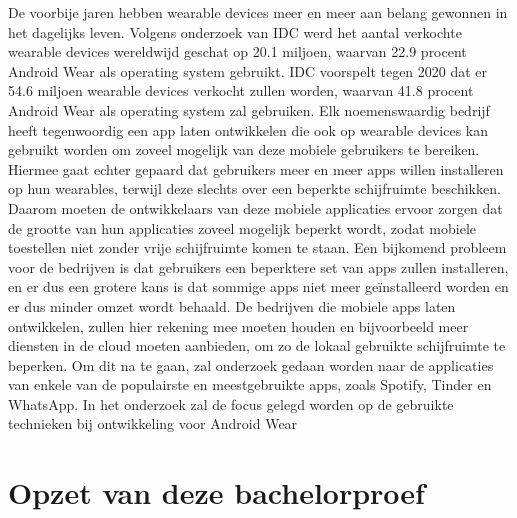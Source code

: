 De voorbije jaren hebben wearable devices meer en meer aan belang gewonnen in het dagelijks leven. Volgens onderzoek van IDC\cite{apew} werd het aantal verkochte wearable devices wereldwijd geschat op 20.1 miljoen, waarvan 22.9 procent Android Wear als operating system gebruikt. IDC voorspelt tegen 2020 dat er 54.6 miljoen wearable devices verkocht zullen worden, waarvan 41.8 procent Android Wear als operating system zal gebruiken. Elk noemenswaardig bedrijf heeft tegenwoordig een app laten ontwikkelen die ook op wearable devices kan gebruikt worden om zoveel mogelijk van deze mobiele gebruikers te bereiken. Hiermee gaat echter gepaard dat gebruikers meer en meer apps willen installeren op hun wearables, terwijl deze slechts over een beperkte schijfruimte beschikken. Daarom moeten de ontwikkelaars van deze mobiele applicaties ervoor zorgen dat de grootte van hun applicaties zoveel mogelijk beperkt wordt, zodat mobiele toestellen niet zonder vrije schijfruimte komen te staan. Een bijkomend probleem voor de bedrijven is dat gebruikers een beperktere set van apps zullen installeren, en er dus een grotere kans is dat sommige apps niet meer geïnstalleerd worden en er dus minder omzet wordt behaald. De bedrijven die mobiele apps laten ontwikkelen, zullen hier rekening mee moeten houden en bijvoorbeeld meer diensten in de cloud moeten aanbieden, om zo de lokaal gebruikte schijfruimte te beperken. Om dit na te gaan, zal onderzoek gedaan worden naar de applicaties van enkele van de populairste en meestgebruikte apps, zoals Spotify, Tinder en WhatsApp. In het onderzoek zal de focus gelegd worden op de gebruikte technieken bij ontwikkeling voor Android Wear


\section{Opzet van deze bachelorproef}
\label{sec:opzet-bachelorproef}








